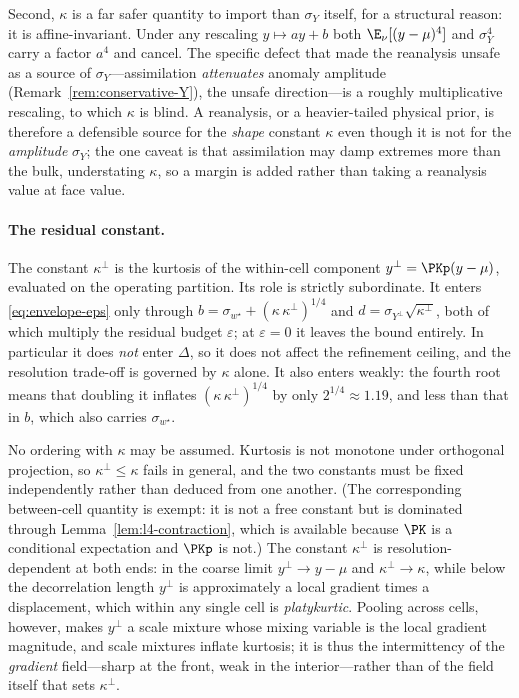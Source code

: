 \begin{remark}
Second, $\kappa$ is a far safer quantity to import than $\sigma_Y$
itself, for a structural reason: it is affine-invariant. Under any
rescaling $y\mapsto ay+b$ both $\E_\nu[(y-\mu)^4]$ and $\sigma_Y^4$ carry
a factor $a^4$ and cancel. The specific defect that made the reanalysis
unsafe as a source of $\sigma_Y$---assimilation \emph{attenuates}
anomaly amplitude (Remark~\ref{rem:conservative-Y}), the unsafe
direction---is a roughly multiplicative rescaling, to which $\kappa$ is
blind. A reanalysis, or a heavier-tailed physical prior, is therefore a
defensible source for the \emph{shape} constant $\kappa$ even though it
is not for the \emph{amplitude} $\sigma_Y$; the one caveat is that
assimilation may damp extremes more than the bulk, understating $\kappa$,
so a margin is added rather than taking a reanalysis value at face value.

\paragraph*{The residual constant.}
The constant $\kappa^{\perp}$ is the kurtosis of the within-cell
component $y^{\perp}=\PKp(y-\mu)$, evaluated on the operating partition.
Its role is strictly subordinate. It enters \eqref{eq:envelope-eps} only
through $b=\sigma_{w^{\star}}+(\kappa\,\kappa^{\perp})^{1/4}$ and
$d=\sigma_{Y^{\perp}}\sqrt{\kappa^{\perp}}$, both of which multiply the
residual budget $\varepsilon$; at $\varepsilon=0$ it leaves the bound
entirely. In particular it does \emph{not} enter $\Delta$, so it does not
affect the refinement ceiling, and
the resolution trade-off is governed
by $\kappa$ alone. It also enters weakly: the fourth root means that
doubling it inflates $(\kappa\,\kappa^{\perp})^{1/4}$ by only
$2^{1/4}\approx1.19$, and less than that in $b$, which also carries
$\sigma_{w^{\star}}$.

No ordering with $\kappa$ may be assumed. Kurtosis is not monotone under
orthogonal projection, so $\kappa^{\perp}\le\kappa$ fails in general, and
the two constants must be fixed independently rather than deduced from
one another. (The corresponding between-cell quantity is exempt: it is
not a free constant but is dominated through
Lemma~\ref{lem:l4-contraction}, which is available because $\PK$ is a
conditional expectation and $\PKp$ is not.) The constant $\kappa^{\perp}$
is
resolution-dependent at both ends: in the coarse limit
$y^{\perp}\to y-\mu$ and $\kappa^{\perp}\to\kappa$, while below the
decorrelation length $y^{\perp}$ is approximately a local gradient times
a displacement, which within any single cell is \emph{platykurtic}.
Pooling across cells, however, makes $y^{\perp}$ a scale mixture whose
mixing variable is the local gradient magnitude, and scale mixtures
inflate kurtosis; it is thus the intermittency of the \emph{gradient}
field---sharp at the front, weak in the interior---rather than of the
field itself that sets $\kappa^{\perp}$.


\end{remark}
